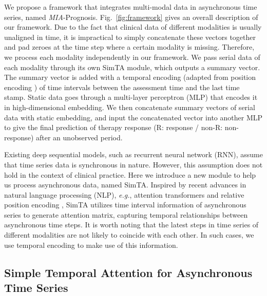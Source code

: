 \documentclass[runningheads]{llncs}
\newcommand{\eg}{\textit{e.g.}}
\newcommand{\miap}{\emph{MIA}-Prognosis}
\begin{document}
	We propose a framework that integrates multi-modal data in asynchronous time series, named \miap. Fig.~\ref{fig:framework} gives an overall description of our framework. Due to the fact that clinical data of different modalities is usually unaligned in time, it is impractical to simply concatenate these vectors together and pad zeroes at the time step where a certain modality is missing. Therefore, we process each modality independently in our framework. We pass serial data of each modality through its own SimTA module, which outputs a summary vector. The summary vector is added with a temporal encoding (adapted from position encoding \cite{Vaswani2017AttentionIA}) of time intervals between the assessment time and the last time stamp. Static data goes through a multi-layer perceptron (MLP) that encodes it in high-dimensional embedding. We then concatenate summary vectors of serial data with static embedding, and input the concatenated vector into another MLP to give the final prediction of therapy response (R: response / non-R: non-response) after an unobserved period. 
	
	Existing deep sequential models, such as recurrent neural network (RNN), assume that time series data is synchronous in nature. However, this assumption does not hold in the context of clinical practice. Here we introduce a new module to help us process asynchronous data, named SimTA. Inspired by recent advances in natural language processing (NLP), \eg, attention transformers \cite{Vaswani2017AttentionIA,Devlin2019BERTPO} and relative position encoding \cite{Shaw2018SelfAttentionWR}, SimTA utilizes time interval information of asynchronous series to generate attention matrix, capturing temporal relationships between asynchronous time steps. It is worth noting that the latest steps in time series of different modalities are not likely to coincide with each other. In such cases, we use temporal encoding to make use of this information.

\subsection{Simple Temporal Attention for Asynchronous Time Series} \label{sec:simta}
\end{document}
